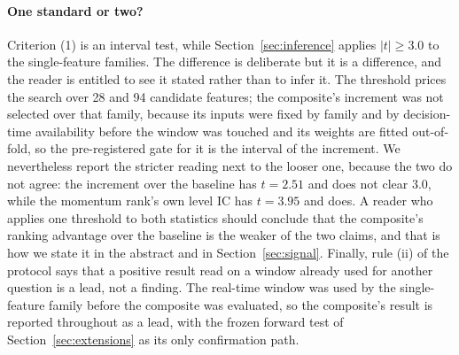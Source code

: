 \paragraph{One standard or two?} Criterion (1) is an interval test, while Section~\ref{sec:inference} applies $|t|\ge3.0$ to the single-feature families. The difference is deliberate but it is a difference, and the reader is entitled to see it stated rather than to infer it. The threshold prices the search over 28 and 94 candidate features; the composite's increment was not selected over that family, because its inputs were fixed by family and by decision-time availability before the window was touched and its weights are fitted out-of-fold, so the pre-registered gate for it is the interval of the increment. We nevertheless report the stricter reading next to the looser one, because the two do not agree: the increment over the baseline has $t=2.51$ and does not clear 3.0, while the momentum rank's own level IC has $t=3.95$ and does. A reader who applies one threshold to both statistics should conclude that the composite's ranking advantage over the baseline is the weaker of the two claims, and that is how we state it in the abstract and in Section~\ref{sec:signal}. Finally, rule (ii) of the protocol says that a positive result read on a window already used for another question is a lead, not a finding. The real-time window was used by the single-feature family before the composite was evaluated, so the composite's result is reported throughout as a lead, with the frozen forward test of Section~\ref{sec:extensions} as its only confirmation path.

